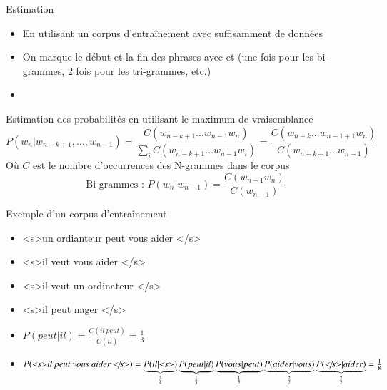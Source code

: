 \documentclass{KodeBook}
\begin{document}
Estimation
\begin{itemize}
	\item En utilisant un corpus d'entraînement avec suffisamment de données
	\item On marque le début et la fin des phrases avec  et  (une fois pour les bi-grammes, 2 fois pour les tri-grammes, etc.)
	\item {}
\end{itemize}

\begin{block}{Estimation des probabilités en utilisant le maximum de vraisemblance}
	{\small \[%
		P(w_n | w_{n-k+1},\ldots, w_{n-1}) = \frac{C(w_{n-k+1} \ldots w_{n-1} w_n)}{\sum_i C(w_{n-k+1} \ldots w_{n-1} w_i)}
		= \frac{C(w_{n-k} \ldots w_{n-1+1} w_n)}{C(w_{n-k+1} \ldots w_{n-1})}
		\]}
	Où $C$ est le nombre d'occurrences des N-grammes dans le corpus
	\[%
	\text{Bi-grammes : } P(w_n | w_{n-1}) = \frac{C(w_{n-1} w_n)}{C(w_{n-1})}
	\]
\end{block}

\begin{exampleblock}{Exemple d'un corpus d'entraînement}
	\begin{itemize}
		\item \textless s\textgreater un ordianteur peut vous aider \textless/s\textgreater
		\item \textless s\textgreater il veut vous aider \textless/s\textgreater
		\item \textless s\textgreater il veut un ordinateur \textless/s\textgreater
		\item \textless s\textgreater il peut nager \textless/s\textgreater
	\end{itemize}
\end{exampleblock}

\begin{itemize}
	\item $P(peut | il) = \frac{C(il\ peut)}{C(il)} = \frac{1}{3}$
	\item $P(\text{\textit{\textless s\textgreater il peut vous aider \textless/s\textgreater}}) = 
	\underbrace{P(il|\text{\textit{\textless s\textgreater}})}_{\frac{3}{4}}
	\underbrace{P(peut|il)}_{\frac{1}{3}} 
	\underbrace{P(vous|peut)}_{\frac{1}{2}} 
	\underbrace{P(aider|vous)}_{\frac{2}{2}}
	\underbrace{P(\text{\textit{\textless/s\textgreater}}|aider)}_{\frac{2}{2}} = 
	\frac{1}{8}
	$
\end{itemize}
\end{document}
